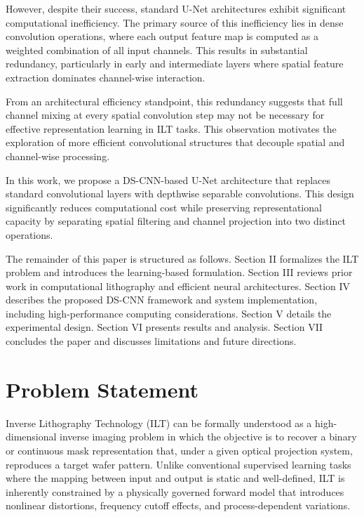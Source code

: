 \documentclass[conference]{IEEEtran}
\begin{document}
However, despite their success, standard U-Net architectures exhibit significant computational inefficiency. The primary source of this inefficiency lies in dense convolution operations, where each output feature map is computed as a weighted combination of all input channels. This results in substantial redundancy, particularly in early and intermediate layers where spatial feature extraction dominates channel-wise interaction.




From an architectural efficiency standpoint, this redundancy suggests that full channel mixing at every spatial convolution step may not be necessary for effective representation learning in ILT tasks. This observation motivates the exploration of more efficient convolutional structures that decouple spatial and channel-wise processing.

In this work, we propose a DS-CNN-based U-Net architecture that replaces standard convolutional layers with depthwise separable convolutions. This design significantly reduces computational cost while preserving representational capacity by separating spatial filtering and channel projection into two distinct operations.

The remainder of this paper is structured as follows. Section II formalizes the ILT problem and introduces the learning-based formulation. Section III reviews prior work in computational lithography and efficient neural architectures. Section IV describes the proposed DS-CNN framework and system implementation, including high-performance computing considerations. Section V details the experimental design. Section VI presents results and analysis. Section VII concludes the paper and discusses limitations and future directions.










\section{\textbf{Problem Statement}}

Inverse Lithography Technology (ILT) can be formally understood as a high-dimensional inverse imaging problem in which the objective is to recover a binary or continuous mask representation that, under a given optical projection system, reproduces a target wafer pattern. Unlike conventional supervised learning tasks where the mapping between input and output is static and well-defined, ILT is inherently constrained by a physically governed forward model that introduces nonlinear distortions, frequency cutoff effects, and process-dependent variations.
\end{document}
